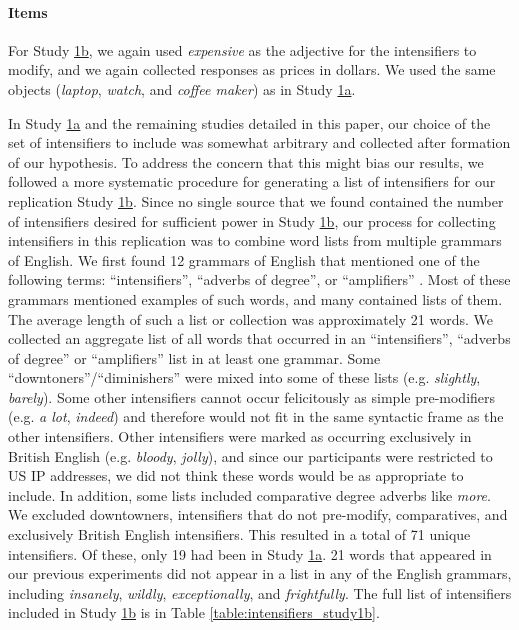 \documentclass[10pt,letterpaper]{article}
\newcommand{\w}[1]{\emph{#1}}
\begin{document}
\paragraph{Items}

For Study \hyperref[sec:study1b]{1b}, we again used \w{expensive} as the adjective for the intensifiers to modify, and we again collected responses as prices in dollars.
We used the same objects (\w{laptop}, \w{watch}, and \w{coffee maker}) as in Study  \hyperref[sec:study1a]{1a}.

In Study  \hyperref[sec:study1a]{1a} and the remaining studies detailed in this paper, our choice of the set of intensifiers to include was somewhat arbitrary and collected after formation of our hypothesis.
To address the concern that this might bias our results, we followed a more systematic procedure for generating a list of intensifiers for our replication Study \hyperref[sec:study1b]{1b}.
Since no single source that we found contained the number of intensifiers desired for sufficient power in Study \hyperref[sec:study1b]{1b}, our process for collecting intensifiers in this replication was to combine word lists from multiple grammars of English.
We first found 12 grammars of English that mentioned one of the following terms: ``intensifiers'', ``adverbs of degree'', or ``amplifiers'' \cite{aarts_oxford_2014,douglas_longman_2000,declerck_comprehensive_1991,garner_chicago_2016,givon_english_1993,greenbaum_oxford_1996,huddleston_cambridge_2002,huddleston_introduction_1984,nelson_english:_2010,quirk_grammar_1972,quirk_students_1990,van_gelderen_introduction_2010}.
Most of these grammars mentioned examples of such words, and many contained lists of them.
The average length of such a list or collection was approximately 21 words.
We collected an aggregate list of all words that occurred in an ``intensifiers'', ``adverbs of degree'' or ``amplifiers'' list in at least one grammar.
Some ``downtoners''/``diminishers'' were mixed into some of these lists (e.g. \w{slightly}, \w{barely}).
Some other intensifiers cannot occur felicitously as simple pre-modifiers (e.g. \w{a lot}, \w{indeed}) and therefore would not fit in the same syntactic frame as the other intensifiers.
Other intensifiers were marked as occurring exclusively in British English (e.g. \w{bloody}, \w{jolly}), and since our participants were restricted to US IP addresses, we did not think these words would be as appropriate to include.
In addition, some lists included comparative degree adverbs like \w{more}.
We excluded downtowners, intensifiers that do not pre-modify, comparatives, and exclusively British English intensifiers.
This resulted in a total of 71 unique intensifiers.
Of these, only 19 had been in Study \hyperref[sec:study1a]{1a}.
21 words that appeared in our previous experiments did not appear in a list in any of the English grammars, including \w{insanely}, \w{wildly}, \w{exceptionally}, and \w{frightfully}.
The full list of intensifiers included in Study \hyperref[sec:study1b]{1b} is in Table \hyperref[table:intensifiers_study1a]{\ref{table:intensifiers_study1b}}.
\end{document}
